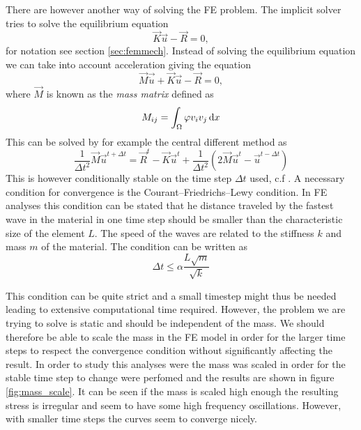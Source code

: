\documentclass[grain_boundary_law.tex]{subfiles}
\begin{document}
There are however another way of solving the FE problem. The implicit solver tries to solve the equilibrium equation
%
\begin{equation}
  \vec{K} \vec{u} - \vec{R} = 0,
\end{equation}
%
for notation see section \ref{sec:femmech}. Instead of solving the equilibrium equation we can take into account acceleration giving the equation
%
\begin{equation}
 \vec{M}\vec{\ddot{u}} + \vec{K} \vec{u} - \vec{R} = 0,
\end{equation}
%
where $\vec{M}$ is known as the  \textit{mass matrix} defined as
%
\begin{equation}
M_{ij} = \int_\Omega \varphi v_i v_j \, \mathrm{d} x
\end{equation}
%
This can be solved by for example the central different method as
%
\begin{equation}
\frac{1}{\Delta t^2} \vec{M} \vec{u}^{t + \Delta t} = \vec{R}^t - \vec{K} \vec{u}^t + \frac{1}{\Delta t^2} \left(2 \vec{M} \vec{u}^{t} - \vec{u}^{t-\Delta t} \right)
\end{equation}
This is however conditionally stable on the time step $\Delta t$ used, c.f \cite{Park1977343}. A necessary condition for convergence is the  Courant–Friedrichs–Lewy condition. In FE analyses this condition can be stated that he distance traveled by the fastest wave in the material in one time step should be smaller than the characteristic size of the element $L$. The speed of the waves are related to the stiffness $k$ and mass $m$ of the material. The condition can be written as
\begin{equation}
\Delta t \leq \alpha \frac{L \sqrt{m}}{\sqrt{k}}
\end{equation}

This condition can be quite strict and a small timestep might thus be needed leading to extensive computational time required. However, the problem we are trying to solve is static and should be independent of the mass. We should therefore be able to scale the mass in the FE model in order for the larger time steps to respect the convergence condition without significantly affecting the result. In order to study this analyses were the mass was scaled in order for the stable time step to change were perfomed and the results are shown in figure \ref{fig:mass_scale}. It can be seen if the mass is scaled high enough the resulting stress is irregular and seem to have some high frequency oscillations. However, with smaller time steps the curves seem to converge nicely. 
\end{document}
